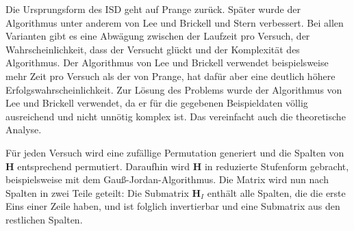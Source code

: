 \documentclass[a4paper,10pt,ngerman]{scrartcl}
\begin{document}
Die Ursprungsform des ISD geht auf Prange \cite{prangeUseInformationSets1962} zurück.
Später wurde der Algorithmus unter anderem von Lee und Brickell \cite{leeObservationSecurityMcEliece1988} und Stern \cite{sternMethodFindingCodewords1989} verbessert. 
Bei allen Varianten gibt es eine Abwägung zwischen der Laufzeit pro Versuch, der Wahrscheinlichkeit, dass der Versucht glückt und der Komplexität des Algorithmus. Der Algorithmus von Lee und Brickell verwendet beispielsweise mehr Zeit pro Versuch als der von Prange, hat dafür aber eine deutlich höhere Erfolgswahrscheinlichkeit. 
Zur Lösung des Problems wurde der Algorithmus von Lee und Brickell verwendet, da er für die gegebenen Beispieldaten völlig ausreichend und nicht unnötig komplex ist. Das vereinfacht auch die theoretische Analyse. 
Für jeden Versuch wird eine zufällige Permutation generiert und die Spalten von $\mathbf{H}$ entsprechend permutiert. Daraufhin wird $\mathbf{H}$ in reduzierte Stufenform gebracht, beispielsweise mit dem Gauß-Jordan-Algorithmus.
Die Matrix wird nun nach Spalten in zwei Teile geteilt: Die Submatrix $\mathbf{H}_I$ enthält alle Spalten, die die erste Eins einer Zeile haben, und ist folglich invertierbar und eine Submatrix aus den restlichen Spalten. 
\end{document}
